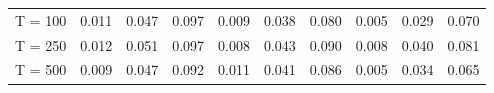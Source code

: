 % 
\begin{tabular}{cccccccccc}
  \hline
  \hline
T = 100 & 0.011 & 0.047 & 0.097 & 0.009 & 0.038 & 0.080 & 0.005 & 0.029 & 0.070 \\ 
  T = 250 & 0.012 & 0.051 & 0.097 & 0.008 & 0.043 & 0.090 & 0.008 & 0.040 & 0.081 \\ 
  T = 500 & 0.009 & 0.047 & 0.092 & 0.011 & 0.041 & 0.086 & 0.005 & 0.034 & 0.065 \\ 
   \hline
\end{tabular}
